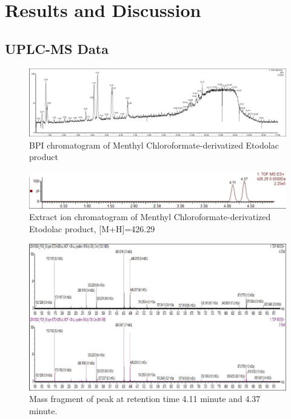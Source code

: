 \documentclass[12pt]{article} %
\begin{document}
  

\newpage

\section {Results and Discussion}

\subsection {UPLC-MS Data}


\begin{figure}[h]
  \includegraphics[width=\linewidth]{bpi.png}
  \caption{BPI chromatogram of Menthyl Chloroformate-derivatized Etodolac product }
  \label{fig:fig2}
\end{figure}
\begin{figure}[h]
  \includegraphics[width=\linewidth]{fig3.png}
  \caption{Extract ion chromatogram of Menthyl Chloroformate-derivatized Etodolac product, [M+H]=426.29}
  \label{fig:fig3}
\end{figure}
\begin{figure}[h!]
  \includegraphics[width=\linewidth]{fig4.png}
  \caption{Mass fragment of peak at retention time 4.11 minute and 4.37 minute.}
  \label{fig:fig4}
\end{figure}
\end{document}
